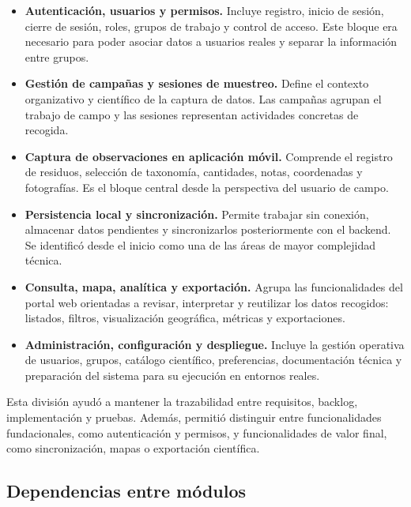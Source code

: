 \begin{itemize}[leftmargin=1.4em]
\item \textbf{Autenticación, usuarios y permisos.} Incluye registro, inicio de
sesión, cierre de sesión, roles, grupos de trabajo y control de acceso. Este bloque
era necesario para poder asociar datos a usuarios reales y separar la información
entre grupos.

\item \textbf{Gestión de campañas y sesiones de muestreo.} Define el contexto
organizativo y científico de la captura de datos. Las campañas agrupan el trabajo
de campo y las sesiones representan actividades concretas de recogida.

\item \textbf{Captura de observaciones en aplicación móvil.} Comprende el registro
de residuos, selección de taxonomía, cantidades, notas, coordenadas y fotografías.
Es el bloque central desde la perspectiva del usuario de campo.

\item \textbf{Persistencia local y sincronización.} Permite trabajar sin conexión,
almacenar datos pendientes y sincronizarlos posteriormente con el backend. Se
identificó desde el inicio como una de las áreas de mayor complejidad técnica.

\item \textbf{Consulta, mapa, analítica y exportación.} Agrupa las funcionalidades
del portal web orientadas a revisar, interpretar y reutilizar los datos recogidos:
listados, filtros, visualización geográfica, métricas y exportaciones.

\item \textbf{Administración, configuración y despliegue.} Incluye la gestión
operativa de usuarios, grupos, catálogo científico, preferencias, documentación
técnica y preparación del sistema para su ejecución en entornos reales.
\end{itemize}

Esta división ayudó a mantener la trazabilidad entre requisitos, backlog,
implementación y pruebas. Además, permitió distinguir entre funcionalidades
fundacionales, como autenticación y permisos, y funcionalidades de valor final,
como sincronización, mapas o exportación científica.

\subsection{Dependencias entre módulos}

